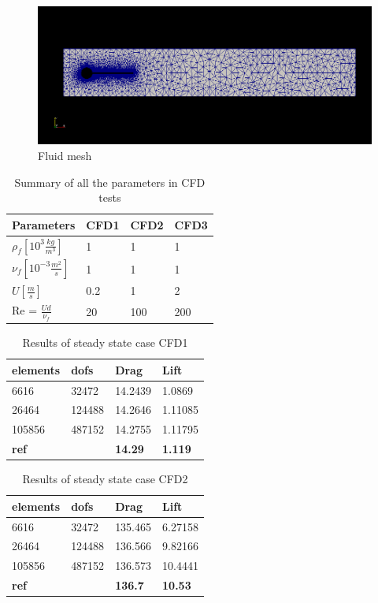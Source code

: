 \begin{figure}[H]
\caption{Fluid mesh}
\includegraphics[scale=0.5,trim={24mm 46mm 14mm 40mm},clip]{./Verification_Validation/Hron_Turek/fluid.png}
\end{figure}

\vspace{1cm}

\begin{table}[H]
\centering
\caption{Summary of all the parameters in CFD tests}
\label{my-label}
\begin{tabular}{|l|l|l|l|}
\hline
Parameters & CFD1 & CFD2 & CFD3 \\ \hline
$\rho_f [10^3 \frac{kg}{m^3}]$ & 1 & 1 & 1 \\ \hline
$\nu_f [10^{-3} \frac{m^2}{s}]$ & 1 & 1 & 1 \\ \hline
$ U [\frac{m}{s}] $ & 0.2 & 1 & 2 \\ \hline
Re = $\frac{Ud}{\nu_f}$ & 20 & 100 & 200 \\ \hline
\end{tabular}
\end{table}

\begin{table}[H]
\centering
\caption{Results of steady state case CFD1}
\label{my-label}
\begin{tabular}{|l|l|l|l|}
\hline
\textbf{elements} & \textbf{dofs} & \textbf{Drag} & \textbf{Lift} \\ \hline
6616 & 32472 & 14.2439 & 1.0869 \\ \hline
26464 & 124488 & 14.2646 & 1.11085 \\ \hline
105856 & 487152 & 14.2755 & 1.11795 \\ \hline
\textbf{ref} & \textbf{} & \textbf{14.29} & \textbf{1.119} \\ \hline
\end{tabular}
\end{table}

\begin{table}[H]
\centering
\caption{Results of steady state case CFD2}
\label{my-label}
\begin{tabular}{|l|l|l|l|}
\hline
\textbf{elements} & \textbf{dofs} & \textbf{Drag} & \textbf{Lift} \\ \hline
6616 & 32472 & 135.465 & 6.27158 \\ \hline
26464 & 124488 & 136.566 & 9.82166 \\ \hline
105856 & 487152 & 136.573 & 10.4441 \\ \hline
\textbf{ref} & \textbf{} & \textbf{136.7} & \textbf{10.53} \\ \hline
\end{tabular}
\end{table}

